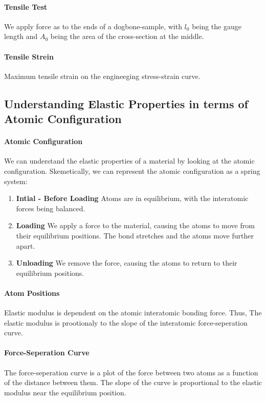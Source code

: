 \documentclass[11pt]{article}
\begin{document}
\paragraph{Tensile Test} We apply force as to the ends of a dogbone-sample, with $l_0$ being the gauge length and $A_0$ being the area of the cross-section at the middle. 
\paragraph{Tensile Strein} Maximum tensile strain on the engineeging stress-strain curve.
\subsection{Understanding Elastic Properties in terms of Atomic Configuration}
\paragraph{Atomic Configuration} We can understand the elastic properties of a material by looking at the atomic configuration. Skemetically, we can represent the atomic configuration as a spring system:
\begin{enumerate}
    \item \textbf{Intial - Before Loading} Atoms are in equilibrium, with the interatomic forces being balanced.
    \item \textbf{Loading} We apply a force to the material, causing the atoms to move from their equilibrium positions. The bond stretches and the atoms move further apart.
    \item \textbf{Unloading} We remove the force, causing the atoms to return to their equilibrium positions. 
\end{enumerate}
\paragraph{Atom Positions} Elastic modulus is dependent on the atomic interatomic bonding force. Thus, The elastic modulus is prootionaly to the slope of the interatomic force-seperation curve.
\paragraph{Force-Seperation Curve} The force-seperation curve is a plot of the force between two atoms as a function of the distance between them. The slope of the curve is proportional to the elastic modulus near the equilibrium position.
\end{document}
